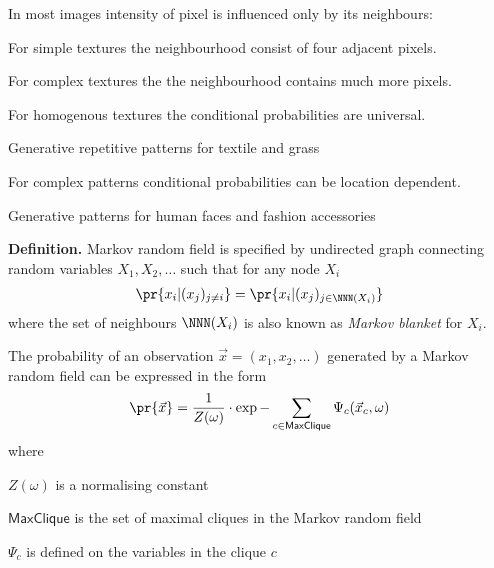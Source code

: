 \documentclass[landscape,footrule]{foils}
\begin{document}
In most images intensity of pixel is influenced only by its neighbours:
\begin{triangles}
\item For simple textures the neighbourhood consist of four adjacent pixels.
\item For complex textures the the neighbourhood contains much more pixels.
\item For homogenous textures the conditional probabilities are universal\vspace*{0.5ex}.
\begin{diamonds}
\item Generative repetitive patterns for textile and grass\vspace*{1ex}   
\end{diamonds}

\item For complex patterns conditional probabilities can be location dependent.\vspace*{0.5ex}

\begin{diamonds}
\item Generative patterns for human faces and fashion accessories 
\end{diamonds}
\end{triangles}



\textbf{Definition.}
Markov random field is specified by undirected graph connecting random variables $X_1,X_2,\ldots$ such that for any node $X_i$ 
\begin{align*}
\pr{x_i|(x_j)_{j\neq i}}=\pr{x_i| (x_j)_{j\in\NNN(X_i)} }
\end{align*}
where the set of neighbours $\NNN(X_i)$ is also known as \emph{Markov blanket} for $X_i$. 



The probability of an observation $\vec{x}=(x_1,x_2,\ldots)$ generated by a Markov random field can be expressed in the form 
\begin{align*}
\pr{\vec{x}}=\frac{1}{Z(\omega)}\cdot\exp{-\sum_{c\in\textsf{MaxClique}}\Psi_c(\vec{x}_c,\omega)} 
\end{align*}  
where
\begin{triangles}
\item $Z(\omega)$ is a normalising constant
\item $\textsf{MaxClique}$ is the set of maximal cliques in the Markov random field
\item $\Psi_c$ is defined on the variables in the clique $c$ 
\end{triangles}
\vspace*{2ex}
\end{document}
